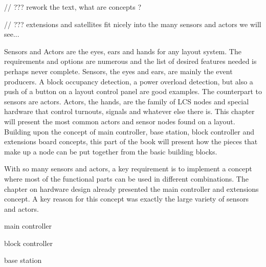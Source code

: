 
// ??? rework the text, what are concepts ?

// ??? extensions and satellites fit nicely into the many sensors and actors we will see...



Sensors and Actors are the eyes, ears and hands for any layout system. The requirements and options are numerous and the list of desired features needed is perhaps never complete. Sensors, the eyes and ears, are mainly the event producers. A block occupancy detection, a power overload detection, but also a push of a button on a layout control panel are good examples. The counterpart to sensors  are actors. Actors, the hands, are the family of LCS nodes and special hardware that control turnouts, signals and whatever else there is. This chapter will present the most common actors and sensor nodes found on a layout. Building upon the concept of main controller, base station, block controller and extensions board concepts, this part of the book will present how the pieces that make up a node can be put together from the basic building blocks.

With so many sensors and actors, a key requirement is to implement a concept where most of the functional parts can be used in different combinations. The chapter on hardware design already presented the main controller and extensions concept. A key reason for this concept was exactly the large variety of sensors and actors.

\begin{smallGapItemize}
\item main controller
\item block controller
\item base station
\end{smallGapItemize}

